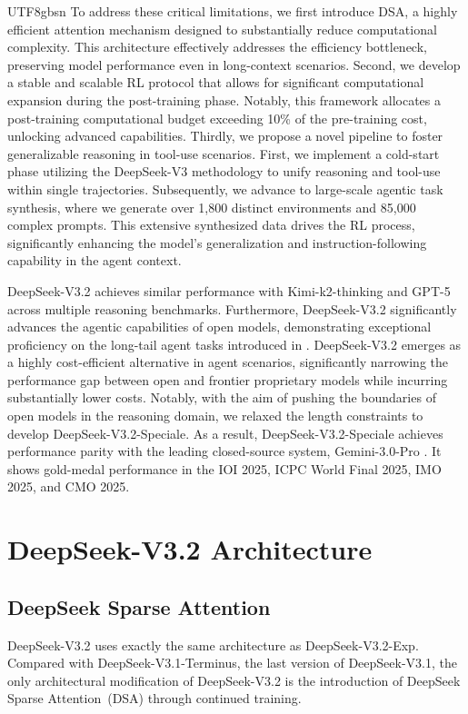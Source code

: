 \documentclass[11pt, a4paper, logo, copyright, nonumbering]{deepseek}
\def\newmodel{DeepSeek-V3.2}
\def\highmodel{DeepSeek-V3.2-Speciale}
\def\oldmodel{DeepSeek-V3.1-Terminus}
\def\methodfull{DeepSeek Sparse Attention}
\def\method{DSA}
\begin{document}
\begin{CJK*}{UTF8}{gbsn}
To address these critical limitations, we first introduce DSA, a highly efficient attention mechanism designed to substantially reduce computational complexity. This architecture effectively addresses the efficiency bottleneck, preserving model performance even in long-context scenarios. Second, we develop a stable and scalable RL protocol that allows for significant computational expansion during the post-training phase. Notably, this framework allocates a post-training computational budget exceeding 10\% of the pre-training cost, unlocking advanced capabilities. Thirdly, we propose a novel pipeline to foster generalizable reasoning in tool-use scenarios. First, we implement a cold-start phase utilizing the DeepSeek-V3 \citep{deepseekv3} methodology to unify reasoning and tool-use within single trajectories. Subsequently, we advance to large-scale agentic task synthesis, where we generate over 1,800 distinct environments and 85,000 complex prompts. This extensive synthesized data drives the RL process, significantly enhancing the model's generalization and instruction-following capability in the agent context. 

\newmodel{} achieves similar performance with Kimi-k2-thinking and GPT-5 across multiple reasoning benchmarks. Furthermore, \newmodel{} significantly advances the agentic capabilities of open models, demonstrating exceptional proficiency on the long-tail agent tasks introduced in \citet{mcpmark,mcpuniverse,li2025tool}. \newmodel{} emerges as a highly cost-efficient alternative in agent scenarios, significantly narrowing the performance gap between open and frontier proprietary models while incurring substantially lower costs.
Notably, with the aim of pushing the boundaries of open models in the reasoning domain, we relaxed the length constraints to develop \highmodel{}. As a result, \highmodel{} achieves performance parity with the leading closed-source system, Gemini-3.0-Pro \citep{gemini3}. It shows gold-medal performance in the IOI 2025, ICPC World Final 2025, IMO 2025, and CMO 2025.

\section{\newmodel{} Architecture}

\subsection{DeepSeek Sparse Attention}
\newmodel{} uses exactly the same architecture as DeepSeek-V3.2-Exp. 
Compared with \oldmodel{}, the last version of DeepSeek-V3.1, the only architectural modification of \newmodel{} is the introduction of \methodfull{}~(\method{}) through continued training.


\end{CJK*}
\end{document}
